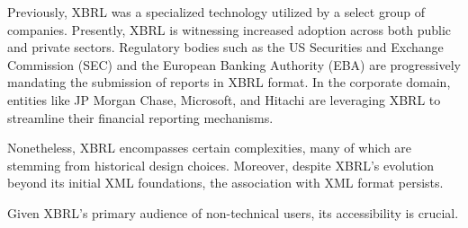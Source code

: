 Previously, XBRL was a specialized technology utilized by a select group of companies.
Presently, XBRL is witnessing increased adoption across both public and private sectors.
Regulatory bodies such as the US Securities and Exchange Commission (SEC)\cite{sec_ixbrl} and the European Banking Authority (EBA)\cite{eba_reporting_frameworks} are progressively mandating the submission of reports in XBRL format.
In the corporate domain, entities like JP Morgan Chase, Microsoft, and Hitachi are leveraging XBRL to streamline their financial reporting mechanisms.\cite{pwc2002thejournal}

Nonetheless, XBRL encompasses certain complexities,
many of which are stemming from historical design choices.
Moreover, despite XBRL's evolution beyond its initial XML foundations,
the association with XML format persists.

Given XBRL's primary audience of non-technical users, its accessibility is crucial.

